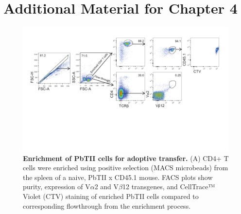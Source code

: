 
\chapter{Additional Material for Chapter 4}

\graphicspath{{Appendix3/Figs/}}

\begin{figure}
    \centering
    \includegraphics[width=\textwidth]{"Fig S1 rev3"}
    \caption[Enrichment of PbTII cells for adoptive transfer]{\textbf{Enrichment of PbTII cells for adoptive transfer.} (A) CD4+ T cells were enriched using positive selection (MACS microbeads) from the spleen of a naive, PbTII x CD45.1 mouse. FACS plots show purity, expression of V\( \alpha \)2 and V\( \beta \)12 transgenes, and CellTrace™ Violet (CTV) staining of enriched PbTII cells compared to corresponding flowthrough from the enrichment process.}
    \label{fig:ms1}
\end{figure}

